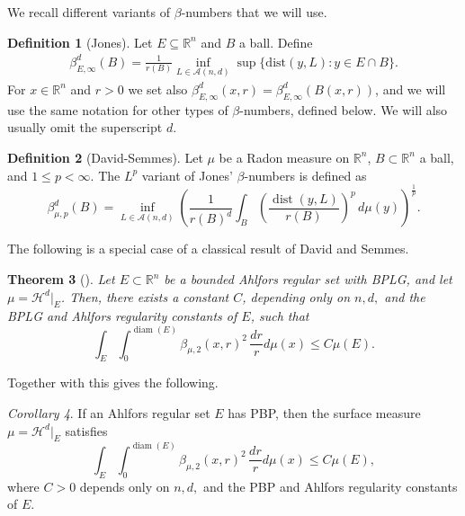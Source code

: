 \documentclass[11pt,reqno]{amsart}
\DeclareMathOperator{\diam}{diam}
\def\dist{\mathop\mathrm{dist}} 						%
\newcommand{\fr}[2]{\frac{#1}{#2}}
\newtheorem{theorem}{Theorem}[section]
\theoremstyle{definition}
\newtheorem{definition}[theorem]{Definition}
\theoremstyle{remark}
\numberwithin{equation}{section}
\newcommand{\R}{\mathbb{R}}
\theoremstyle{theorem}
\newtheorem{coro}[theorem]{Corollary}
\theoremstyle{definition}
\theoremstyle{remark}
\numberwithin{equation}{section}
\begin{document}
	We recall different variants of $\beta$-numbers that we will use.
	\begin{definition}[Jones]\label{d:jones-beta}
		Let $E \subseteq \R^n$ and $B$ a ball. Define
		\begin{align*}
		\beta_{E,\infty}^d(B) = \frac{1}{r(B)}\inf_{L\in\mathcal{A}(n,d)} \sup\{\text{dist}(y,L) : y \in E \cap B\}.
		\end{align*}
		For $x\in\R^n$ and $r>0$ we set also $\beta_{E,\infty}^d(x,r) = \beta_{E,\infty}^d(B(x,r))$, and we will use the same notation for other types of $\beta$-numbers, defined below. We will also usually omit the superscript $d$.
	\end{definition}
	\begin{definition}[David-Semmes]
		Let $\mu$ be a Radon measure on $\R^n$, $B\subset\R^n$ a ball, and $1\le p<\infty$. The $L^p$ variant of Jones' $\beta$-numbers is defined as
		\begin{equation*}		
		\beta_{\mu,p}^{d}(B) = \inf_{L\in\mathcal{A}(n,d)}\left( \frac{1}{r(B)^d} \int_B \left( \frac{\dist(y, L)}{r(B)}\right)^p \, d\mu(y) \right)^{\frac{1}{p}}.
		\end{equation*} 
	\end{definition}
	The following is a special case of a classical result of David and Semmes.
 \begin{theorem}[\cite{david1991singular}]
		Let $E\subset\R^n$ be a bounded Ahlfors regular set with BPLG, and let $\mu=\mathcal{H}^d|_E$. Then, there exists a constant $C$, depending only on $n,d,$ and the BPLG and Ahlfors regularity constants of $E$, such that
		\begin{equation*}
		\int_E\int_0^{\diam(E)} \beta_{\mu,2}(x,r)^2\, \fr{dr}{r}d\mu(x)\le C\mu(E).
		\end{equation*}
	\end{theorem}
	Together with  this gives the following.
	\begin{coro}\label{cor:PBPbetas}
		If an Ahlfors regular set $E$ has PBP, then the surface measure $\mu=\mathcal{H}^d|_E$ satisfies
		\begin{equation}\label{eq:PBPbetas}
		\int_E\int_0^{\diam(E)} \beta_{\mu,2}(x,r)^2\, \fr{dr}{r}d\mu(x)\le C\mu(E),
		\end{equation}
		where $C>0$ depends only on $n,d,$ and the PBP and Ahlfors regularity constants of $E$.
	\end{coro}
\end{document}
